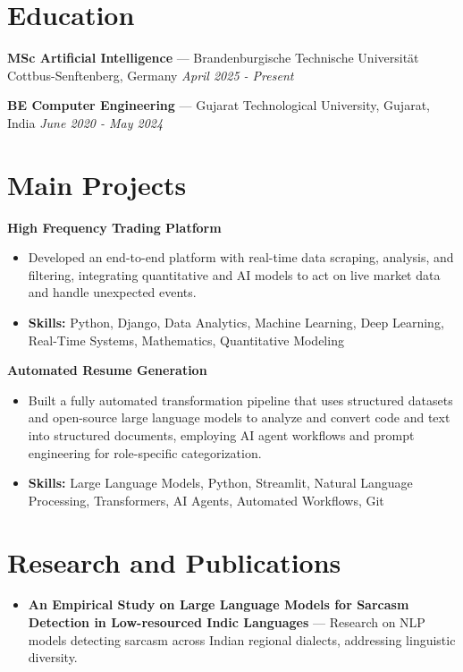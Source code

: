 \documentclass[a4paper,10pt]{article}
\begin{document}
\section*{Education}
\textbf{MSc Artificial Intelligence} — Brandenburgische Technische Universität Cottbus-Senftenberg, Germany \hfill \textit{April 2025 - Present}\par
\vspace{1.5pt}
\textbf{BE Computer Engineering} — Gujarat Technological University, Gujarat, India \hfill \textit{June 2020 - May 2024}\par

\section*{Main Projects}
\textbf{High Frequency Trading Platform}\par
\vspace{1pt}
\begin{itemize}
  \item Developed an end-to-end platform with real-time data scraping, analysis, and filtering, integrating quantitative and AI models to act on live market data and handle unexpected events.
  \item \textbf{Skills:} Python, Django, Data Analytics, Machine Learning, Deep Learning, Real-Time Systems, Mathematics, Quantitative Modeling
\end{itemize}
\vspace{3pt}
\textbf{Automated Resume Generation}\par
\vspace{1pt}
\begin{itemize}
  \item Built a fully automated transformation pipeline that uses structured datasets and open-source large language models to analyze and convert code and text into structured documents, employing AI agent workflows and prompt engineering for role-specific categorization.
  \item \textbf{Skills:} Large Language Models, Python, Streamlit, Natural Language Processing, Transformers, AI Agents, Automated Workflows, Git
\end{itemize}

\section*{Research and Publications}
\begin{itemize}
\item \textbf{An Empirical Study on Large Language Models for Sarcasm Detection in Low-resourced Indic Languages} — Research on NLP models detecting sarcasm across Indian regional dialects, addressing linguistic diversity.
\end{itemize}
\end{document}
